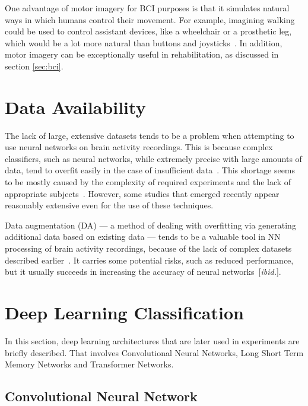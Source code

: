 \documentclass[english, he, bc, kiv, iso690alph, viewonly]{fasthesis}
\begin{document}
One advantage of motor imagery for BCI purposes is that it simulates natural ways in which humans control their movement. For example, imagining walking could be used to control assistant devices, like a wheelchair or a prosthetic leg, which would be a lot more natural than buttons and joysticks~\cite{he:bci:legs:18}. In addition, motor imagery can be exceptionally useful in rehabilitation, as discussed in section \ref{sec:bci}.

\section{Data Availability}

The lack of large, extensive datasets tends to be a problem when attempting to use neural networks on brain activity recordings. This is because complex classifiers, such as neural networks, while extremely precise with large amounts of data, tend to overfit easily in the case of insufficient data~\cite{domingos:ml:12}. This shortage seems to be mostly caused by the complexity of required experiments and the lack of appropriate subjects~\cite{he:da:21}. However, some studies that emerged recently appear reasonably extensive even for the use of these techniques.

Data augmentation (DA) --- a method of dealing with overfitting via generating additional data based on existing data --- tends to be a valuable tool in NN processing of brain activity recordings, because of the lack of complex datasets described earlier~\cite{he:da:21}. It carries some potential risks, such as reduced performance, but it usually succeeds in increasing the accuracy of neural networks~[\emph{ibid.}].


\section{Deep Learning Classification}

In this section, deep learning architectures that are later used in experiments are briefly described. That involves Convolutional Neural Networks, Long Short Term Memory Networks and Transformer Networks.


\subsection{Convolutional Neural Network}
\end{document}
